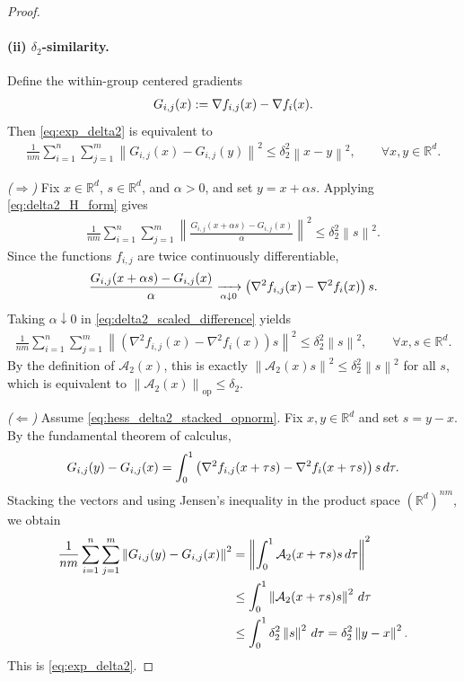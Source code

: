 \documentclass{article}
\newcommand{\bb}{\mathbb}
\newcommand{\op}{\operatorname{op}}
\newcommand{\R}{\bb R}
\newcommand{\sqn}[1]{\left\| #1 \right\|^2}
\newcommand{\opnorm}[1]{\left\| #1 \right\|_{\op}}      %
\newcommand{\eqdef}{:=}
\newcommand{\rb}[1]{\left(#1\right)}
\theoremstyle{plain}
\begin{document}
\begin{proof}
\paragraph{(ii) $\delta_2$-similarity.}
Define the within-group centered gradients
\begin{align}
    G_{i,j}(x)\eqdef \nabla f_{i,j}(x)-\nabla f_i(x).
    \notag
\end{align}
Then \eqref{eq:exp_delta2} is equivalent to
\begin{align}
    \frac1{nm}\sum_{i=1}^n\sum_{j=1}^m
    \sqn{G_{i,j}(x)-G_{i,j}(y)}
    \le
    \delta_2^2\sqn{x-y},
    \qquad
    \forall x,y\in\R^d .
    \label{eq:delta2_H_form}
\end{align}

\smallskip
\noindent
\emph{($\Rightarrow$)}
Fix $x\in\R^d$, $s\in\R^d$, and $\alpha>0$, and set
$y=x+\alpha s$. Applying \eqref{eq:delta2_H_form} gives
\begin{align}
    \frac1{nm}\sum_{i=1}^n\sum_{j=1}^m
    \sqn{
    \frac{G_{i,j}(x+\alpha s)-G_{i,j}(x)}{\alpha}}
    \le
    \delta_2^2\sqn{s}.
    \label{eq:delta2_scaled_difference}
\end{align}
Since the functions $f_{i,j}$ are twice continuously differentiable,
\begin{align}
    \frac{G_{i,j}(x+\alpha s)-G_{i,j}(x)}{\alpha}
    \xrightarrow[\alpha\downarrow 0]{}
    \rb{\nabla^2 f_{i,j}(x)-\nabla^2 f_i(x)}s .
    \notag
\end{align}
Taking $\alpha\downarrow 0$ in \eqref{eq:delta2_scaled_difference} yields
\begin{align}
    \frac1{nm}\sum_{i=1}^n\sum_{j=1}^m
    \sqn{
    \rb{\nabla^2 f_{i,j}(x)-\nabla^2 f_i(x)}s}
    \le
    \delta_2^2\sqn{s},
    \qquad
    \forall x,s\in\R^d .
    \label{eq:delta2_directional_hessian}
\end{align}
By the definition of $\mathcal{A}_2(x)$, this is exactly
$\sqn{\mathcal{A}_2(x)s}\le \delta_2^2\sqn{s}$ for all $s$,
which is equivalent to $\opnorm{\mathcal{A}_2(x)}\le \delta_2$.

\smallskip
\noindent
\emph{($\Leftarrow$)}
Assume \eqref{eq:hess_delta2_stacked_opnorm}. Fix $x,y\in\R^d$
and set $s=y-x$. By the fundamental theorem of calculus,
\begin{align}
    G_{i,j}(y)-G_{i,j}(x)
    =
    \int_0^1
    \rb{\nabla^2 f_{i,j}(x+\tau s)-\nabla^2 f_i(x+\tau s)}s
    \,d\tau .
    \notag
\end{align}
Stacking the vectors and using Jensen's inequality in the product space
$(\R^d)^{nm}$, we obtain
\begin{align}
    \frac1{nm}\sum_{i=1}^n\sum_{j=1}^m
    \sqn{G_{i,j}(y)-G_{i,j}(x)}
    &=
    \sqn{
    \int_0^1
    \mathcal{A}_2(x+\tau s)s
    \,d\tau}
    \notag
    \\
    &\le
    \int_0^1
    \sqn{\mathcal{A}_2(x+\tau s)s}
    \,d\tau
    \notag
    \\
    &\le
    \int_0^1
    \delta_2^2\sqn{s}
    \,d\tau
    =
    \delta_2^2\sqn{y-x}.
    \notag
\end{align}
This is \eqref{eq:exp_delta2}.
\end{proof}
\end{document}
